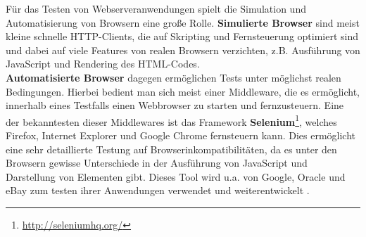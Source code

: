 Für das Testen von Webserveranwendungen spielt die Simulation und Automatisierung von Browsern eine große Rolle. \textbf{Simulierte Browser} sind meist kleine schnelle HTTP-Clients, die auf Skripting und Fernsteuerung optimiert sind und dabei auf viele Features von realen Browsern verzichten, z.B. Ausführung von JavaScript und Rendering des HTML-Codes. \\
\textbf{Automatisierte Browser} dagegen ermöglichen Tests unter möglichst realen Bedingungen. Hierbei bedient man sich meist einer Middleware, die es ermöglicht, innerhalb eines Testfalls einen Webbrowser zu starten und fernzusteuern. Eine der bekanntesten dieser Middlewares ist das Framework \textbf{Selenium}\footnote{\url{http://seleniumhq.org/}}, welches Firefox, Internet Explorer und Google Chrome fernsteuern kann. Dies ermöglicht eine sehr detaillierte Testung auf Browserinkompatibilitäten, da es unter den Browsern gewisse Unterschiede in der Ausführung von JavaScript und Darstellung von Elementen gibt. Dieses Tool wird u.a. von Google, Oracle und eBay zum testen ihrer Anwendungen verwendet und weiterentwickelt \citep{selenium_hq_selenium_2010}.
